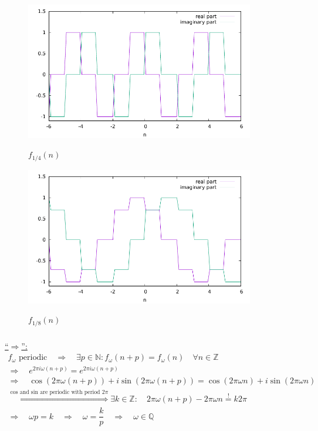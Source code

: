 \documentclass[11pt,a4paper]{scrartcl}
\begin{document}
\newpage
\begin{figure}[h]
\centering
\includegraphics[width=10cm]{f4.pdf}
\label{f4}
\caption{$f_{1/4}(n)$}
\end{figure}

\begin{figure}[h]
\centering
\includegraphics[width=10cm]{f8.pdf}
\label{f8}
\caption{$f_{1/8}(n)$}
\end{figure}

\subsubsection{}
\underline{"`$\Rightarrow$"':}
\begin{align}
f_\omega \text{ periodic}\quad\Rightarrow\quad \exists p\in\mathbb{N}: f_\omega(n+p)=f_\omega(n)\quad\forall n\in\mathbb{Z}\\
\Rightarrow \quad e^{2\pi i\omega (n+p)} = e^{2\pi i\omega (n+p)}\\
\Rightarrow \quad \cos(2\pi \omega (n+p)) + i\sin(2\pi \omega (n+p)) = \cos(2\pi \omega n) + i\sin(2\pi \omega n)\\
\overset{\text{cos and sin are periodic with period }2\pi}{\Rightarrow}\exists k\in\mathbb{Z}:\quad2\pi \omega (n+p) - 2\pi \omega n\overset{!}{=}k2\pi\\
\Rightarrow \quad \omega p = k \quad\Rightarrow\quad \omega = \dfrac{k}{p}\quad \Rightarrow \quad\omega\in\mathbb{Q}
\end{align}
\end{document}
